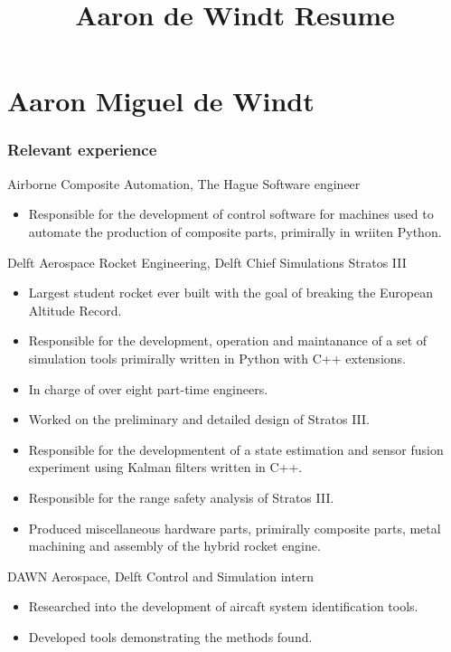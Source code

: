 \documentclass{tccv}
\title{Aaron de Windt Resume}
\begin{document}
\part{Aaron Miguel de Windt}

\section{Relevant experience}

\begin{eventlist}


     {Airborne Composite Automation, The Hague}
     {Software engineer}
\begin{itemize}
    \item{Responsible for the development of control software for machines used to automate the production of composite parts, primirally in wriiten Python.}
\end{itemize}


     {Delft Aerospace Rocket Engineering, Delft}
     {Chief Simulations Stratos III}
\begin{itemize}
    \item{Largest student rocket ever built with the goal of breaking the European Altitude Record.}
    \item{Responsible for the development, operation and maintanance of a set of simulation tools primirally written in Python with C++ extensions.}
    \item{In charge of over eight part-time engineers.}
    \item{Worked on the preliminary and detailed design of Stratos III.}
    \item{Responsible for the developmentent of a state estimation and sensor fusion experiment using Kalman filters written in C++.}
    \item{Responsible for the range safety analysis of Stratos III.}
    \item{Produced miscellaneous hardware parts, primirally composite parts, metal machining and assembly of the hybrid rocket engine.}
\end{itemize}

     {DAWN Aerospace, Delft}
     {Control and Simulation intern}
\begin{itemize}
    \item{Researched into the development of aircaft system identification tools.}
    \item{Developed tools demonstrating the methods found.}
\end{itemize}


\end{eventlist}
\end{document}

